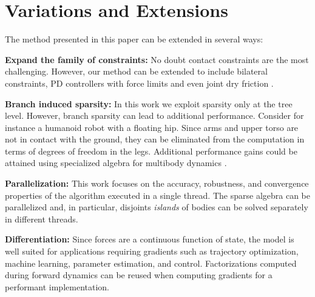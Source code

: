 \section{Variations and Extensions}
\label{sec:variations_and_extensions}

The method presented in this paper can be extended in several ways:

\textbf{Expand the family of constraints:} No doubt contact constraints are the
most challenging. However, our method can be extended to include bilateral
constraints, PD controllers with force limits and even joint dry friction
\cite{bib:todorov2014}.

\textbf{Branch induced sparsity:} In this work we exploit sparsity only at the
tree level. However, branch sparsity can lead to additional performance.
Consider for instance a humanoid robot with a floating hip. Since arms and upper
torso are not in contact with the ground, they can be eliminated from the
computation in terms of degrees of freedom in the legs. Additional performance
gains could be attained using specialized algebra for multibody dynamics
\cite{bib:carpentier2021}.

\textbf{Parallelization:} This work focuses on the accuracy, robustness, and
convergence properties of the algorithm executed in a single thread. The sparse
algebra can be parallelized and, in particular, disjoints \emph{islands} of
bodies can be solved separately in different threads.


\textbf{Differentiation:} Since forces are a continuous function of state, the
model is well suited for applications requiring gradients such as trajectory
optimization, machine learning, parameter estimation, and control.
Factorizations computed during forward dynamics can be reused when computing
gradients for a performant implementation.
